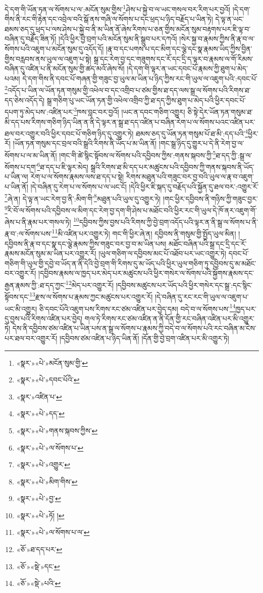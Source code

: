 དེ་དག་གི་ཡོན་ཏན་ལ་སོགས་པ་ལ་:མངོན་སུམ་གྱིས་\footnote{«སྣར་»«པེ་»མངོན་སུམ་གྱི་}ཤེས་པ་སྐྱེ་བ་ལ་ཡང་གསལ་བར་རིག་པར་བྱའོ། །དེ་དག་གིས་ནི་རང་གི་རྟེན་དང་འབྲེལ་བའི་སྒོ་ནས་གཞི་ལ་སོགས་པ་དང་ཕྲད་པ་ཉིད་བརྗོད་པ་ཡིན་ཏེ། དེ་ལྟ་ན་ཡང་ཐམས་ཅད་དུ་ཕྲད་པ་ལས་ཤེས་པ་སྐྱེ་བ་ནི་མ་ཡིན་ནོ་ཞེས་རིགས་པ་ཅན་གྱིས་མངོན་སུམ་བརྟགས་པར་ཇི་ལྟ་བ་བཞིན་དུ་བརྗོད་ཟིན་ཏོ། །དེའི་ཕྱིར་བྱེ་བྲག་པའི་མངོན་སུམ་ནི་སྒྲུབ་པར་དཀའོ། །སེར་སྐྱ་བ་རྣམས་ཀྱིས་ནི་རྣ་བ་ལ་སོགས་པའི་འཇུག་པ་མངོན་སུམ་དུ་འདོད་དོ། །རྣ་བ་དང་པགས་པ་དང་མིག་དང་ལྕེ་དང་སྣ་རྣམས་ཡིད་ཀྱིས་བྱིན་གྱིས་བརླབས་ནས་ཡུལ་ལ་འཇུག་པ་སྟེ། སྒྲ་དང་རེག་བྱ་དང་གཟུགས་དང་རོ་དང་དྲི་ད་ལྟར་བ་རྣམས་ལ་གོ་རིམས་བཞིན་དུ་འཛིན་པ་ནི་མངོན་སུམ་གྱི་ཚད་མའོ་ཞེས་སོ། །དེ་དག་གི་ལྟར་ན་ཡང་དབང་པོ་རྣམས་ཀྱི་ཐུག་པ་མེད་པའམ། དེ་དག་གིས་ནི་དབང་པོ་གཞན་གྱི་གཟུང་བྱ་ཡུལ་མ་ཡིན་པ་ཉིད་ཀྱིས་རང་གི་ཡུལ་ལ་འཇུག་པའི་:དབང་པོ་\footnote{«སྣར་»«པེ་»དབང་པོའི་}འདོད་པ་ཡིན་ལ་ཡོན་ཏན་གསུམ་གྱི་འཕེལ་བ་དང་འགྲིབ་པ་ཙམ་གྱིས་ཐ་དད་ལས་སྒྲ་ལ་སོགས་པའི་རིགས་ཐ་དད་ཅེས་འདོད་དེ། སྒྲ་གཅིག་པུ་ཡང་ཡོན་ཏན་གྱི་འཕེལ་འགྲིབ་ཀྱི་ཐ་དད་ཀྱིས་ཐུག་པ་མེད་པའི་ཕྱིར་དབང་པོ་དཔག་ཏུ་མེད་པས་:འཛིན་པར་\footnote{«སྣར་»འཛིན་པ་}ཁས་བླང་བར་བྱའོ། །ཡང་ན་དབང་གཅིག་འགྱུར། ཅི་སྟེ་དེར་ཡོན་ཏན་གསུམ་ཐ་མི་དད་པས་རིགས་གཅིག་ཉིད་ཡིན་ན་ནི་དེ་ལྟར་ན་སྒྲ་ཐ་དད་འཛིན་པ་བཞིན་རེག་པ་ལ་སོགས་པའང་འཛིན་པར་ཐལ་བར་འགྱུར་བའི་ཕྱིར་དབང་པོ་གཅིག་ཉིད་དུ་འགྱུར་ཏེ། ཐམས་ཅད་དུ་ཡོན་ཏན་གསུམ་པོ་ཐ་མི་:དད་པའི་\footnote{«སྣར་»«པེ་»དད་}ཕྱིར་རོ། །ཡོན་ཏན་གསུམ་དང་བྲལ་བའི་སྒྲའི་རིགས་ནི་ཡོད་པ་མ་ཡིན་ནོ། །གང་སྒྲ་ཉིད་དུ་གྱུར་པ་དེ་ནི་རེག་བྱ་ལ་སོགས་པ་ལ་མ་ཡིན་ནོ། །གང་གི་ཚེ་སྙིང་སྟོབས་ལ་སོགས་པའི་དབྱིབས་ཀྱིས་:གནས་སྐབས་ཀྱི་\footnote{«སྣར་»«པེ་»གནས་སྐབས་ཀྱིས་}ཐ་དད་ཀྱི་:སྒྲ་ལ་སོགས་པ་དག་\footnote{«སྣར་»«པེ་»ལ་སོགས་པ་}ཐ་དད་པ་ཇི་ལྟར་མེད། སྒྲའི་རིགས་ཐ་མི་དད་པར་མཚུངས་པའི་དབྱིབས་ཀྱི་གནས་སྐབས་ནི་ཡོད་པ་ཡིན་ལ། རེག་པ་ལ་སོགས་རྣམས་ལས་ཐ་དད་པ་སྟེ། རིགས་མཐུན་པའི་གཟུང་བར་བྱ་བའི་ཡུལ་ལ་རྣ་བ་འཇུག་པ་ཡིན་ནོ། །དེ་བཞིན་དུ་རེག་པ་ལ་སོགས་པ་ལ་ཡང་ངོ། །དེའི་ཕྱིར་ཇི་སྐད་དུ་བརྗོད་པའི་སྐྱོན་དུ་ཐལ་བར་:འགྱུར་རོ་\footnote{«སྣར་»«པེ་»འགྱུར་}ཞེ་ན། དེ་ལྟ་ན་ཡང་རེག་བྱ་ནི་:མིག་གི་\footnote{«སྣར་»«པེ་»མིག་གིས་}མཐུན་པའི་ཡུལ་དུ་འགྱུར་ཏེ། །གང་ཕྱིར་དབྱིབས་ནི་གཉིས་ཀྱི་གཟུང་བྱར་\footnote{«སྣར་»«པེ་»བྱ་}རི་བོ་ལ་སོགས་པའི་དབྱིབས་ལ་མིག་དང་རེག་བྱ་དག་གི་ཤེས་པ་མཐོང་བའི་ཕྱིར་རང་གི་ཡུལ་དེ་ཁོ་ནར་འཇུག་གོ་ཞེས་པ་ནི་རྣམ་པར་གསལ་ཏེ། \footnote{«སྣར་»«པེ་»ཏོ། ། }དབྱིབས་ཀྱིས་བྱས་པའི་རིགས་ཀྱི་བྱེ་བྲག་འདོད་པའི་ལྟར་ན་ནི་སྒྲ་ལ་སོགས་པ་ནི་རྣ་བ་:ལ་སོགས་པས་\footnote{«སྣར་»«པེ་»ལ་སོགས་པ་ལ་}མི་འཛིན་པར་འགྱུར་ཏེ། གང་གི་ཕྱིར་ཞེ་ན། དབྱིབས་ནི་གསུམ་གྱི་སྤྱོད་ཡུལ་མིན། །དབྱིབས་ནི་རྣ་བ་དང་སྣ་དང་ལྕེ་རྣམས་ཀྱིས་གཟུང་བར་བྱ་བ་མ་ཡིན་པས། མཐོང་བཞིན་པའི་སྒྲ་དང་དྲི་དང་རོ་རྣམས་མངོན་སུམ་མ་ཡིན་པར་འགྱུར་རོ། །ཡུལ་གཅིག་ལ་དབྱིབས་མང་པོ་འཐོབ་པར་ཡང་འགྱུར་ཏེ། དབང་པོ་གཅིག་གི་ཡུལ་གྱི་དབྱེ་བ་ཡོད་ན་ནི་དེའི་བྱེ་བྲག་གི་རིགས་དུ་མ་ཡོད་པའི་ཕྱིར་ཡུལ་གཅིག་ཏུ་དབྱིབས་དུ་མ་མཐོང་བར་འགྱུར་རོ། །དབྱིབས་རྣམས་ལ་ཁྱད་པར་མེད་པར་མཚུངས་པའི་ཕྱིར་གསེར་ལ་སོགས་པའི་སྐྱོགས་རྣམས་དང་རྒྱན་རྣམས་ཀྱི་:ཐ་དད་ཀྱང་\footnote{«ཅོ་»ཐ་དད་པར་}མེད་པར་འགྱུར་རོ། །དབྱིབས་མཚུངས་པར་ཡོད་པའི་ཕྱིར་གསེར་དང་སྒྲ་:དང་སྙིང་སྟོབས་དང་\footnote{«ཅོ་»«སྡེ་»དང་}རྫས་ལ་སོགས་པ་རྣམས་ཀྱང་མཚུངས་པར་འགྱུར་རོ། །དེ་བཞིན་དུ་རང་རང་གི་ཡུལ་ལ་འཇུག་པ་ཡང་མི་འགྱུར། ཅི་དབང་པོའི་འཇུག་པས་རིགས་རང་ཙམ་འཛིན་པར་བྱེད་དམ། བདེ་བ་ལ་སོགས་པས་\footnote{«ཅོ་»«སྡེ་»པའི་}ཁྱད་པར་དུ་བྱས་པའི་རིགས་འཛིན་པར་བྱེད། གལ་ཏེ་རིགས་རང་ཙམ་འཛིན་ན་ནི་དོན་གྱི་རང་བཞིན་འཛིན་པར་མི་འགྱུར་ཏེ། དེས་ནི་དབྱིབས་ཙམ་འཛིན་པ་ཡིན་པས་ན་སྒྲ་ལ་སོགས་པ་རྣམས་ཀྱི་བདེ་བ་ལ་སོགས་པའི་རང་བཞིན་མ་ངེས་པར་ཐལ་བར་འགྱུར་རོ། །དབྱིབས་ཙམ་འཛིན་པ་ཉིད་ཡིན་ནོ། །དོན་གྱི་བྱེ་བྲག་འཛིན་པར་མི་འགྱུར་ཏེ། 